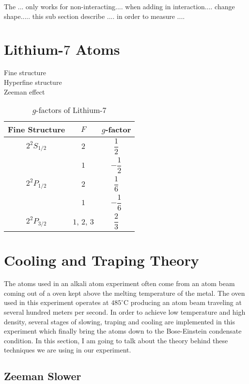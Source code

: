 The ... only works for non-interacting.... when adding in interaction.... change shape..... this sub section describe .... in order to measure ....

\section{Lithium-$7$ Atoms}

Fine structure\\
Hyperfine structure\\
Zeeman effect

\begin{table}
\caption{$g$-factors of Lithium-$7$}
\label{li7:g-factors}
\begin{center}
\begin{tabular}{|c|c|c|}\hline
Fine Structure & $F$ & $g$-factor \\\hline
$2^2S_{1/2}$ & $2$ & $\dfrac 12$ \\\cline{2-3}
 & $1$ & $-\dfrac 12$ \\\hline
$2^2P_{1/2}$ & $2$ & $\dfrac 16$ \\\cline{2-3}
 & $1$ & $-\dfrac 16$ \\\hline
$2^2P_{3/2}$ & $1$, $2$, $3$ & $\dfrac 23$ \\\hline
\end{tabular}
\end{center}
\end{table}


\section{Cooling and Traping Theory}

The atoms used in an alkali atom experiment often come from an atom beam coming out of a oven kept above the melting temperature of the metal. The oven used in this experiment operates at $485^\circ\text{C}$ producing an atom beam traveling at several hundred meters per second. In order to achieve low temperature and high density, several stages of slowing, traping and cooling are implemented in this experiment which finally bring the atoms down to the Bose-Einstein condensate condition. In this section, I am going to talk about the theory behind these techniques we are using in our experiment.

\subsection{Zeeman Slower}\label{theory:zeeman}

